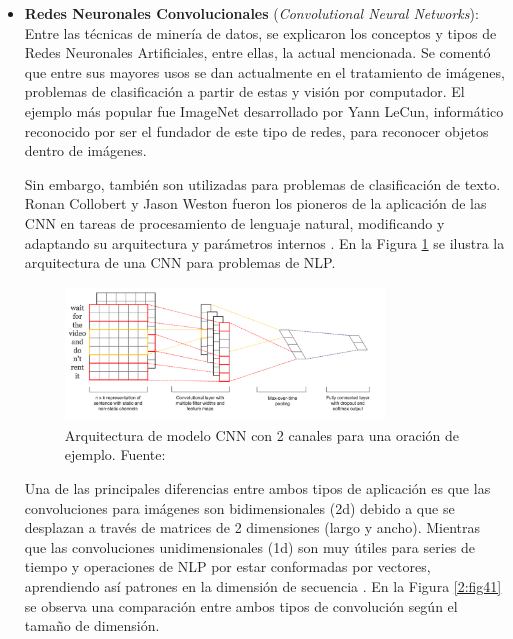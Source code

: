 \begin{itemize}
	\item \textbf{Redes Neuronales Convolucionales} (\textit{Convolutional Neural Networks}): Entre las técnicas de minería de datos, se explicaron los conceptos y tipos de Redes Neuronales Artificiales, entre ellas, la actual mencionada. Se comentó que entre sus mayores usos se dan actualmente en el tratamiento de imágenes, problemas de clasificación a partir de estas y visión por computador. El ejemplo más popular fue ImageNet desarrollado por Yann LeCun, informático reconocido por ser el fundador de este tipo de redes, para reconocer objetos dentro de imágenes.
	
	Sin embargo, también son utilizadas para problemas de clasificación de texto. Ronan Collobert y Jason Weston fueron los pioneros de la aplicación de las CNN en tareas de procesamiento de lenguaje natural, modificando y adaptando su arquitectura y parámetros internos \parencite{bk_kamath2019deeplearning_nlp_sr}. En la Figura \ref{2:fig40} se ilustra la arquitectura de una CNN para problemas de NLP.
	\begin{figure}[!ht]
		\begin{center}
			\includegraphics[width=0.8\textwidth]{2/figures/cnn_nlp.png}
			\caption{Arquitectura de modelo CNN con 2 canales para una oración de ejemplo. Fuente: \cite{tec_kim2014convolutional}}
			\label{2:fig40}
		\end{center}
	\end{figure}
	
	Una de las principales diferencias entre ambos tipos de aplicación es que las convoluciones para imágenes son bidimensionales (2d) debido a que se desplazan a través de matrices de 2 dimensiones (largo y ancho). Mientras que las convoluciones unidimensionales (1d) son muy útiles para series de tiempo y operaciones de NLP por estar conformadas por vectores, aprendiendo así patrones en la dimensión de secuencia \parencite{bk_rao2019nlp_pytorch}. En la Figura \ref{2:fig41} se observa una comparación entre ambos tipos de convolución según el tamaño de dimensión.


\end{itemize}
